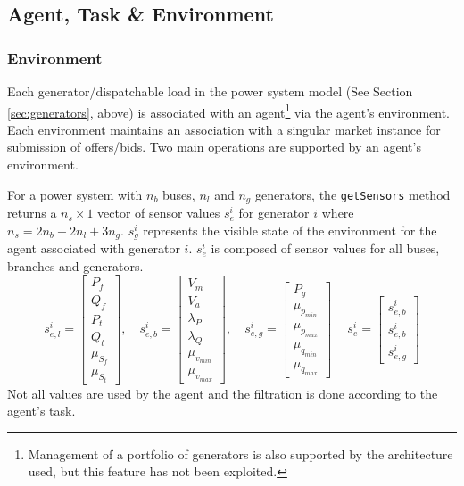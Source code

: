 \subsection{Agent, Task \& Environment}

\subsubsection{Environment}
Each generator/dispatchable load in the power system model (See Section
\ref{sec:generators}, above) is associated with an agent\footnote{Management of
a portfolio of generators is also supported by the architecture used, but this
feature has not been exploited.} via the agent's environment.  Each environment
maintains an association with a singular market instance for submission of
offers/bids.  Two main operations are supported by an agent's environment.

For a power system with $n_b$ buses, $n_l$ and $n_g$ generators, the
\texttt{getSensors} method returns a $n_s \times 1$ vector of sensor values
$s^i_e$ for generator $i$ where $n_s = 2n_b + 2n_l + 3n_g$.  $s^i_g$ represents
the visible state of the environment for the agent associated with generator
$i$.  $s^i_e$ is composed of sensor values for all buses, branches and
generators.
\begin{equation}
s^i_{e,l} =
\begin{bmatrix}
P_f\\
Q_f\\
P_t\\
Q_t\\
\mu_{S_f}\\
\mu_{S_t}
\end{bmatrix}, \quad
s^i_{e,b} =
\begin{bmatrix}
V_m\\
V_a\\
\lambda_P\\
\lambda_Q\\
\mu_{v_{min}}\\
\mu_{v_{max}}
\end{bmatrix}, \quad
s^i_{e,g} =
\begin{bmatrix}
P_g\\
\mu_{p_{min}}\\
\mu_{p_{max}}\\
\mu_{q_{min}}\\
\mu_{q_{max}}
\end{bmatrix}\ \quad
s^i_e =
\begin{bmatrix}
s^i_{e,b}\\
s^i_{e,b}\\
s^i_{e,g}
\end{bmatrix}
\end{equation}
Not all values are used by the agent and the filtration is done according to
the agent's task.

